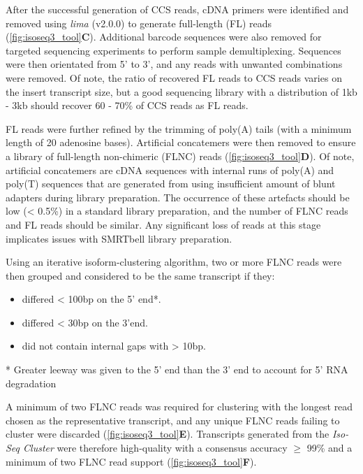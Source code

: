 After the successful generation of CCS reads, cDNA primers were identified and removed using \textit{lima} (v2.0.0) to generate full-length (FL) reads (\cref{fig:isoseq3_tool}\textbf{C}). Additional barcode sequences were also removed for targeted sequencing experiments to perform sample demultiplexing. Sequences were then orientated from 5’ to 3’, and any reads with unwanted combinations were removed. Of note, the ratio of recovered FL reads to CCS reads varies on the insert transcript size, but a good sequencing library with a distribution of 1kb - 3kb should recover 60 - 70\% of CCS reads as FL reads.   

FL reads were further refined by the trimming of poly(A) tails (with a minimum length of 20 adenosine bases). Artificial concatemers were then removed to ensure a library of full-length non-chimeric (FLNC) reads (\cref{fig:isoseq3_tool}\textbf{D}). Of note, artificial concatemers are cDNA sequences with internal runs of poly(A) and poly(T) sequences that are generated from using insufficient amount of blunt adapters during library preparation. The occurrence of these artefacts should be low (< 0.5\%) in a standard library preparation, and the number of FLNC reads and FL reads should be similar. Any significant loss of reads at this stage implicates issues with SMRTbell library preparation.

Using an iterative isoform-clustering algorithm, two or more FLNC reads were then grouped and considered to be the same transcript if they: 
\begin{itemize}
	\item differed < 100bp on the 5’ end*. 
	\item differed < 30bp on the 3’end. 
	\item did not contain internal gaps with > 10bp.
\end{itemize}
* Greater leeway was given to the 5' end than the 3' end to account for 5' RNA degradation

A minimum of two FLNC reads was required for clustering with the longest read chosen as the representative transcript, and any unique FLNC reads failing to cluster were discarded (\cref{fig:isoseq3_tool}\textbf{E}). Transcripts generated from the \textit{Iso-Seq Cluster} were therefore high-quality with a consensus accuracy $\geq$ 99\% and a minimum of two FLNC read support (\cref{fig:isoseq3_tool}\textbf{F}). 

